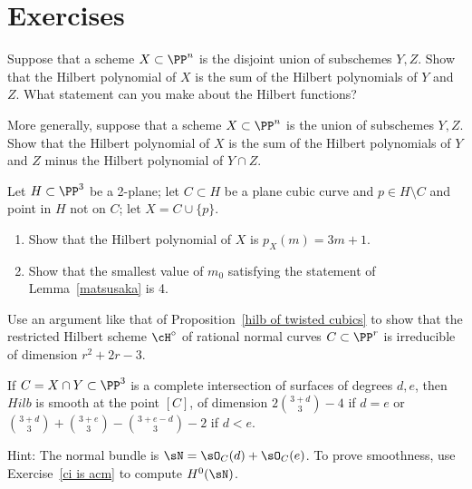 \section{Exercises}


\begin{exercise}\label{deg of disjoint union}
Suppose that a scheme $X\subset \PP^n$ is the disjoint union of subschemes $Y,Z$. Show that the Hilbert polynomial of
$X$ is the sum of the Hilbert polynomials of $Y$ and $Z$. What statement can you make about the Hilbert functions?
\end{exercise}

\begin{exercise}
More generally, suppose that a scheme $X\subset \PP^n$ is the union of subschemes $Y,Z$. Show that the Hilbert polynomial of
$X$ is the sum of the Hilbert polynomials of $Y$ and $Z$ minus the Hilbert polynomial of $Y\cap Z$. 
\end{exercise}

\begin{exercise}
Let $H \subset \PP^3$ be a 2-plane; let $C \subset H$ be a plane cubic curve and $p \in H \setminus C$ and point in $H$ not on $C$; let $X = C \cup \{p\}$.
\begin{enumerate}
\item Show that the Hilbert polynomial of $X$ is $p_X(m) = 3m+1$.
\item Show that the smallest value of $m_0$ satisfying the statement of Lemma~\ref{matsusaka} is 4.
\end{enumerate}
\end{exercise}

\begin{exercise}\label{rational normal hilbert}
Use an  argument like that of Proposition~\ref{hilb of twisted cubics} to show that the restricted Hilbert scheme $\cH^\circ$ of rational normal curves $C \subset \PP^r$ is irreducible of dimension $r^2+2r-3$.
\end{exercise}

\begin{exercise}\label{hilb at a ci}
If $C = X\cap Y\subset \PP^3$ is a complete intersection of surfaces of degrees $d,e$, then
$Hilb$ is smooth at the point $[C]$, of dimension $2\binom{3+d}{3}-4$ if $d=e$
or $\binom{3+d}{3} +\binom{3+e}{3} -\binom{3+e-d}{3} -2$ if $d<e$.

Hint: The normal bundle is $\sN = \sO_C(d)+\sO_C(e)$. To prove smoothness, use
Exercise~\ref{ci is acm} to compute $H^0(\sN)$.
\end{exercise}

